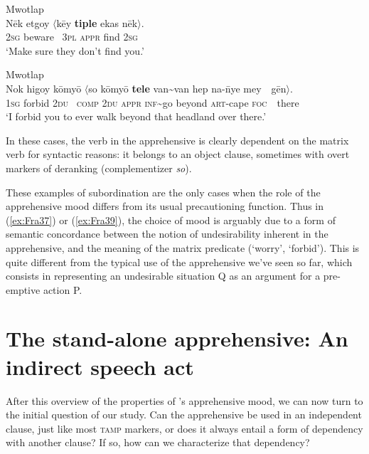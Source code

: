 \documentclass[output=paper,colorlinks,citecolor=brown]{langscibook}
\begin{document}
\ea \label{ex:Fra38} \textnormal{Mwotlap}  \\
\gll Nēk etgoy ${\langle}$kēy \textbf{tiple} ekas nēk${\rangle}$. \\
\textsc{2sg} beware ~\textsc{3pl} \textsc{appr} find \textsc{2sg} \\
\glt `Make sure they don't find you.' 
\z

\ea \label{ex:Fra39} \textnormal{Mwotlap}  \\
\gll Nok higoy kōmyō ${\langle}$so kōmyō \textbf{tele} van\textasciitilde van hep na-\={n}ye mey~~gēn${\rangle}$. \\
\textsc{1sg} forbid \textsc{2du} ~\textsc{comp} \textsc{2du} \textsc{appr} \textsc{inf}\textasciitilde go beyond \textsc{art}-cape \textsc{foc}~~there \\
\glt `I forbid you to ever walk beyond that headland over there.' 
\z

\noindent In these cases, the verb in the apprehensive is clearly dependent on the matrix verb for syntactic reasons: it belongs to an object clause, sometimes with overt markers of deranking (complementizer \textit{so}). 

These examples of subordination are the only cases when the role of the apprehensive mood differs from its usual precautioning function. Thus in (\ref{ex:Fra37}) or (\ref{ex:Fra39}), the choice of mood is arguably due to a form of semantic concordance between the notion of undesirability inherent in the apprehensive, and the meaning of the matrix predicate (`worry', `forbid'). This is quite different from the typical use of the apprehensive we've seen so far, which consists in representing an undesirable situation Q as an argument for a pre-emptive action P.

 





\section{The stand-alone apprehensive: An indirect speech act}
\label{sec:standalone}

After this overview of the properties of 's apprehensive mood, we can now turn to the initial question of our study. Can the apprehensive be used in an independent clause, just like most \textsc{tamp} markers, or does it always entail a form of dependency with another clause? If so, how can we characterize that dependency?
 
\end{document}

